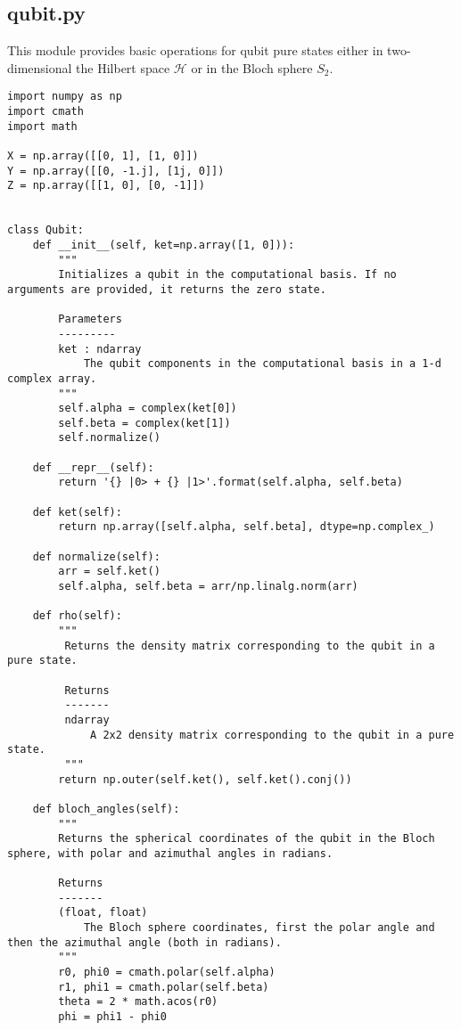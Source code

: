 \subsection{qubit.py}\label{section:listing_qubit}
This module provides basic operations for qubit pure states either in two-dimensional the Hilbert space $\mathcal{H}$ or in the Bloch sphere $S_2$. 
\begin{verbatim}
import numpy as np
import cmath
import math

X = np.array([[0, 1], [1, 0]])
Y = np.array([[0, -1.j], [1j, 0]])
Z = np.array([[1, 0], [0, -1]])


class Qubit:
    def __init__(self, ket=np.array([1, 0])):
        """
        Initializes a qubit in the computational basis. If no arguments are provided, it returns the zero state.

        Parameters
        ---------
        ket : ndarray
            The qubit components in the computational basis in a 1-d complex array.
        """
        self.alpha = complex(ket[0])
        self.beta = complex(ket[1])
        self.normalize()

    def __repr__(self):
        return '{} |0> + {} |1>'.format(self.alpha, self.beta)

    def ket(self):
        return np.array([self.alpha, self.beta], dtype=np.complex_)

    def normalize(self):
        arr = self.ket()
        self.alpha, self.beta = arr/np.linalg.norm(arr)

    def rho(self):
        """
         Returns the density matrix corresponding to the qubit in a pure state.

         Returns
         -------
         ndarray
             A 2x2 density matrix corresponding to the qubit in a pure state.
         """
        return np.outer(self.ket(), self.ket().conj())

    def bloch_angles(self):
        """
        Returns the spherical coordinates of the qubit in the Bloch sphere, with polar and azimuthal angles in radians.

        Returns
        -------
        (float, float)
            The Bloch sphere coordinates, first the polar angle and then the azimuthal angle (both in radians).
        """
        r0, phi0 = cmath.polar(self.alpha)
        r1, phi1 = cmath.polar(self.beta)
        theta = 2 * math.acos(r0)
        phi = phi1 - phi0


\end{verbatim}
